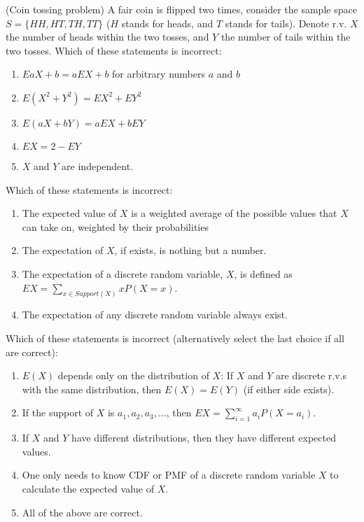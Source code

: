 \documentclass[poll_tutorial_format]{subfiles}
\begin{document}
	
		
	\begin{exercise}
		(Coin tossing problem) A fair coin is flipped two times, consider the sample space $S=\{HH, HT, TH, TT\}$ ($H$ stands for heads, and $T$ stands for tails). Denote r.v. $X$ the number of heads within the two tosses, and $Y$ the number of tails within the two tosses.
		Which of these statements is incorrect: 
		\begin{enumerate}
			\item $EaX+b=aEX+b$ for arbitrary numbers $a$ and $b$ 
			\item $E(X^2 +Y^2)=EX^2 +EY^2$
			\item $E(aX+bY)=aEX +bEY$
			\item $EX=2-EY$ 		
			\item $X$ and $Y$ are independent.
		\end{enumerate}
	\end{exercise}
	
	
	\begin{exercise}
	Which of these statements is incorrect: 
		\begin{enumerate}
			\item The expected value of $X$ is a weighted average of the possible values that $X$ can take on, weighted by their probabilities
			\item The expectation of $X$, if exists, is nothing but a number.
			\item  The expectation of a discrete random variable, $X$, is defined as $EX=\sum_{x\in \textit{Support}(X)} xP(X=x)$.
			\item The expectation of any discrete random variable always exist.  
		\end{enumerate}
	\end{exercise}
	
	
	
	\begin{exercise}
		Which of these statements is incorrect (alternatively select the last choice if all are correct):
		\begin{enumerate}
			\item $E(X)$ depends only on the distribution of $X$: If $X$ and $Y$ are discrete r.v.s with the same distribution, then $E(X) = E(Y)$ (if either side exists).
			\item If the support of $X$ is $a_1, a_2, a_3, \dots$, then $EX=\sum_{i=1}^\infty a_i P(X=a_i)$.
			\item If $X$ and $Y$ have different distributions, then they have different expected values. 
			\item One only needs to know CDF or PMF of a discrete random variable $X$ to calculate the expected value of $X$.
			\item All of the above are correct. 
		\end{enumerate}
	\end{exercise}
	
\end{document}
